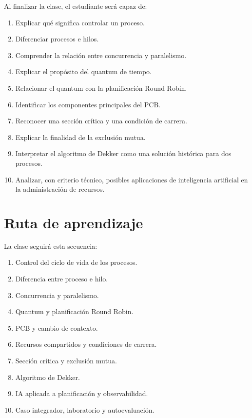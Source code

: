 \documentclass[
  spanish,
  letterpaper,
]{scrbook}
\providecommand{\tightlist}{%
  \setlength{\itemsep}{0pt}\setlength{\parskip}{0pt}}
\begin{document}
Al finalizar la clase, el estudiante será capaz de:

\begin{enumerate}
\def\labelenumi{\arabic{enumi}.}
\tightlist
\item
  Explicar qué significa controlar un proceso.
\item
  Diferenciar procesos e hilos.
\item
  Comprender la relación entre concurrencia y paralelismo.
\item
  Explicar el propósito del quantum de tiempo.
\item
  Relacionar el quantum con la planificación Round Robin.
\item
  Identificar los componentes principales del PCB.
\item
  Reconocer una sección crítica y una condición de carrera.
\item
  Explicar la finalidad de la exclusión mutua.
\item
  Interpretar el algoritmo de Dekker como una solución histórica para
  dos procesos.
\item
  Analizar, con criterio técnico, posibles aplicaciones de inteligencia
  artificial en la administración de recursos.
\end{enumerate}

\section{Ruta de aprendizaje}\label{ruta-de-aprendizaje-1}

La clase seguirá esta secuencia:

\begin{enumerate}
\def\labelenumi{\arabic{enumi}.}
\tightlist
\item
  Control del ciclo de vida de los procesos.
\item
  Diferencia entre proceso e hilo.
\item
  Concurrencia y paralelismo.
\item
  Quantum y planificación Round Robin.
\item
  PCB y cambio de contexto.
\item
  Recursos compartidos y condiciones de carrera.
\item
  Sección crítica y exclusión mutua.
\item
  Algoritmo de Dekker.
\item
  IA aplicada a planificación y observabilidad.
\item
  Caso integrador, laboratorio y autoevaluación.
\end{enumerate}
\end{document}
